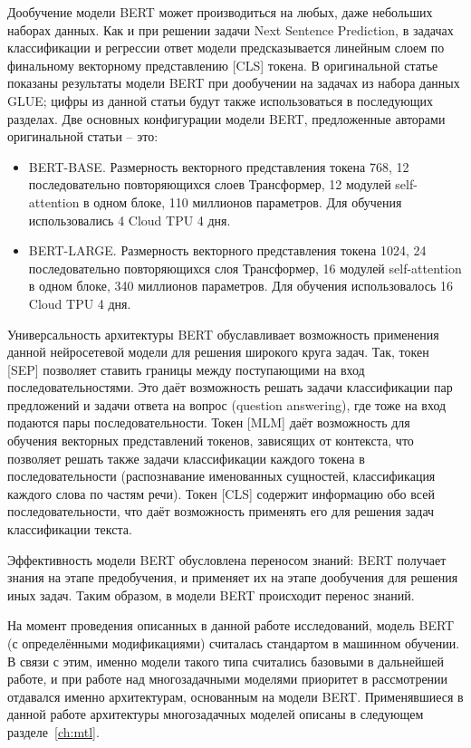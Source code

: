 Дообучение модели BERT может производиться на любых, даже небольших наборах данных. Как и при решении задачи Next Sentence Prediction, в задачах классификации и регрессии ответ модели предсказывается линейным слоем по финальному векторному представлению [CLS] токена. В оригинальной статье показаны результаты модели BERT при дообучении на задачах из набора данных GLUE; цифры из данной статьи будут также использоваться в последующих разделах. 
Две основных конфигурации модели BERT, предложенные авторами оригинальной статьи -- это:
\begin{itemize}
\item BERT-BASE. Размерность векторного представления токена 768, 12 последовательно повторяющихся слоев Трансформер, 12 модулей self-attention в одном блоке, 110 миллионов параметров. Для обучения использовались 4 Cloud TPU 4 дня. 
\item BERT-LARGE. Размерность векторного представления токена 1024, 24 последовательно повторяющихся слоя Трансформер, 16 модулей self-attention в одном блоке, 340 миллионов параметров. Для обучения использовалось 16 Cloud TPU 4 дня. 
\end{itemize}

Универсальность архитектуры BERT обуславливает возможность применения данной нейросетевой модели для решения широкого круга задач. Так, токен [SEP] позволяет ставить границы между поступающими на вход последовательностями. Это даёт возможность решать задачи классификации пар предложений и задачи ответа на вопрос (question answering), где тоже на вход подаются пары последовательности. Токен [MLM] даёт возможность для обучения векторных представлений токенов, зависящих от контекста, что позволяет решать также задачи классификации каждого токена в последовательности (распознавание именованных сущностей, классификация каждого слова по частям речи). Токен [CLS] содержит информацию обо всей последовательности, что даёт возможность применять его для решения задач классификации текста. 

Эффективность модели BERT обусловлена переносом знаний: BERT получает знания на этапе предобучения, и применяет их на этапе дообучения для решения иных задач. Таким образом, в модели BERT происходит перенос знаний. 

На момент проведения описанных в данной работе исследований, модель BERT (с определёнными модификациями) считалась стандартом в машинном обучении. В связи с этим, именно модели такого типа считались базовыми в дальнейшей работе, и при работе над многозадачными моделями приоритет в рассмотрении отдавался именно архитектурам, основанным на модели BERT. Применявшиеся в данной работе архитектуры многозадачных моделей описаны в следующем разделе~\ref{ch:mtl}.

